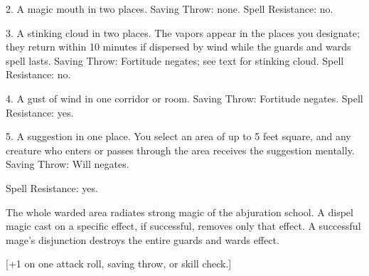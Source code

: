 {2. A magic mouth in two places. Saving Throw: none. Spell Resistance: no.

3. A stinking cloud in two places. The vapors appear in the places you designate; they return within 10 minutes if dispersed by wind while the guards and wards spell lasts. Saving Throw: Fortitude negates; see text for stinking cloud. Spell Resistance: no.

4. A gust of wind in one corridor or room. Saving Throw: Fortitude negates. Spell Resistance: yes.

5. A suggestion in one place. You select an area of up to 5 feet square, and any creature who enters or passes through the area receives the suggestion mentally. Saving Throw: Will negates.

Spell Resistance: yes.

The whole warded area radiates strong magic of the abjuration school. A dispel magic cast on a specific effect, if successful, removes only that effect. A successful mage's disjunction destroys the entire guards and wards effect.}
        
[+1 on one attack roll, saving throw, or skill check.]
        
